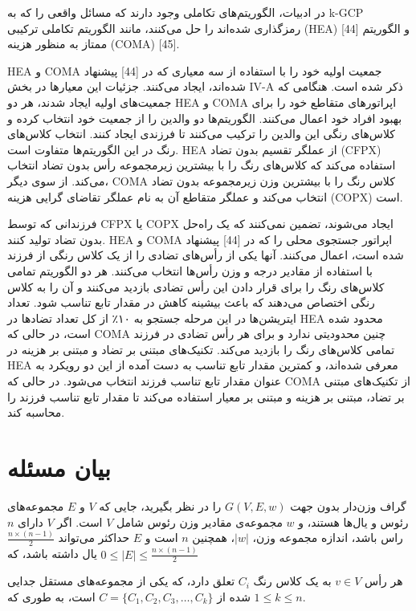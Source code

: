 \documentclass[a4paper,10pt]{article}
\begin{document}
        در ادبیات، الگوریتم‌های تکاملی وجود دارند که مسائل واقعی را که به k-GCP رمزگذاری شده‌اند را حل می‌کنند، مانند الگوریتم تکاملی ترکیبی (HEA) [44] و الگوریتم ممتاز به منظور هزینه (COMA) [45].

        HEA و COMA جمعیت اولیه خود را با استفاده از سه معیاری که در [44] پیشنهاد شده‌اند، ایجاد می‌کنند. جزئیات این معیارها در بخش IV-A ذکر شده است. هنگامی که جمعیت‌های اولیه ایجاد شدند، هر دو HEA و COMA اپراتورهای متقاطع خود را برای بهبود افراد خود اعمال می‌کنند. الگوریتم‌ها دو والدین را از جمعیت خود انتخاب کرده و کلاس‌های رنگی این والدین را ترکیب می‌کنند تا فرزندی ایجاد کنند. انتخاب کلاس‌های رنگ در این الگوریتم‌ها متفاوت است. HEA از عملگر تقسیم بدون تضاد (CFPX) استفاده می‌کند که کلاس‌های رنگ را با بیشترین زیرمجموعه رأس بدون تضاد انتخاب می‌کند. از سوی دیگر، COMA کلاس رنگ را با بیشترین وزن زیرمجموعه بدون تضاد انتخاب می‌کند و عملگر متقاطع آن به نام عملگر تقاضای گرایی هزینه (COPX) است.

        فرزندانی که توسط CFPX یا COPX ایجاد می‌شوند، تضمین نمی‌کنند که یک راه‌حل بدون تضاد تولید کنند. HEA و COMA اپراتور جستجوی محلی را که در [44] پیشنهاد شده است، اعمال می‌کنند. آنها یکی از رأس‌های تضادی را از یک کلاس رنگی از فرزند با استفاده از مقادیر درجه و وزن رأس‌ها انتخاب می‌کنند. هر دو الگوریتم تمامی کلاس‌های رنگ را برای قرار دادن این رأس تضادی بازدید می‌کنند و آن را به کلاس رنگی اختصاص می‌دهند که باعث بیشینه کاهش در مقدار تابع تناسب شود. تعداد ایتریشن‌ها در این مرحله جستجو به ۱۰٪ از کل تعداد تضادها در HEA محدود شده است، در حالی که COMA چنین محدودیتی ندارد و برای هر رأس تضادی در فرزند تمامی کلاس‌های رنگ را بازدید می‌کند. تکنیک‌های مبتنی بر تضاد و مبتنی بر هزینه در HEA معرفی شده‌اند، و کمترین مقدار تابع تناسب به دست آمده از این دو رویکرد به عنوان مقدار تابع تناسب فرزند انتخاب می‌شود. در حالی که COMA از تکنیک‌های مبتنی بر تضاد، مبتنی بر هزینه و مبتنی بر معیار استفاده می‌کند تا مقدار تابع تناسب فرزند را محاسبه کند.

    \section{بیان مسئله}

        گراف وزن‌دار بدون جهت $G(V,E,w)$ را در نظر بگیرید، جایی که $V$ و $E$ مجموعه‌های رئوس و یال‌ها هستند، و $w$ مجموعه‌ی مقادیر وزن رئوس شامل $V$ است. اگر $V$ دارای $n$ راس باشد، اندازه مجموعه وزن، $|w|$، همچنین $n$ است و $E$ حداکثر می‌تواند 
        $\frac{n \times (n-1)}{2}$
        یال داشته باشد، که
        $0 \leq |E| \leq \frac{n \times (n-1)}{2}$

        هر رأس $v \in V$ به یک کلاس رنگ $C_i$ تعلق دارد، که یکی از مجموعه‌های مستقل جدایی شده از 
        $C = \{C_1, C_2, C_3, \dots, C_k\} $
        است، به طوری که
        $1 \leq k \leq n$.
\end{document}
